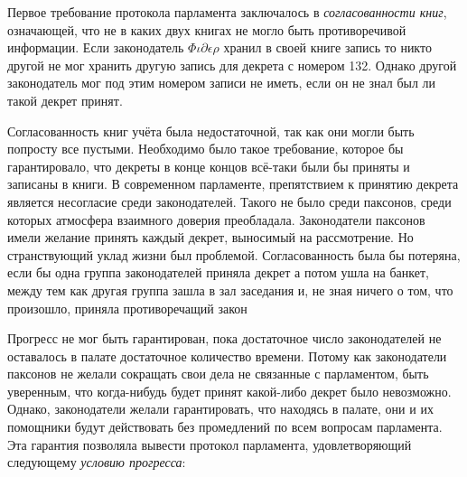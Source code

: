 \documentclass[12pt, a4paper]{article} %
\begin{document}
Первое требование протокола парламента заключалось в \textit{согласованности книг}, означающей, что не в каких двух книгах не могло быть противоречивой информации. Если законодатель $\Phi\iota\partial\epsilon\rho$ хранил в своей книге запись 
то никто другой не мог хранить другую запись для декрета с номером 132. Однако другой законодатель мог под этим номером записи не иметь, если он не знал был ли такой декрет принят.

Согласованность книг учёта была недостаточной, так как они могли быть попросту все пустыми. Необходимо было такое требование, которое бы гарантировало, что декреты в конце концов всё-таки были бы приняты и записаны в книги. В современном парламенте, препятствием к принятию декрета является несогласие среди законодателей. Такого не было среди паксонов, среди которых атмосфера взаимного доверия преобладала. Законодатели паксонов имели желание принять каждый декрет, выносимый на рассмотрение. Но странствующий уклад жизни был проблемой. Согласованность была бы потеряна, если бы одна группа законодателей приняла декрет 
а потом ушла на банкет, между тем как другая группа зашла в зал заседания и, не зная ничего о том, что произошло, приняла противоречащий закон 

Прогресс не мог быть гарантирован, пока достаточное число законодателей не оставалось в палате достаточное количество времени. Потому как законодатели паксонов не желали сокращать свои дела не связанные с парламентом, быть уверенным, что когда-нибудь будет принят какой-либо декрет было невозможно. Однако, законодатели желали гарантировать, что находясь в палате, они и их помощники будут действовать без промедлений по всем вопросам парламента. Эта гарантия позволяла вывести протокол парламента, удовлетворяющий следующему \textit{условию прогресса}:

\end{document}
